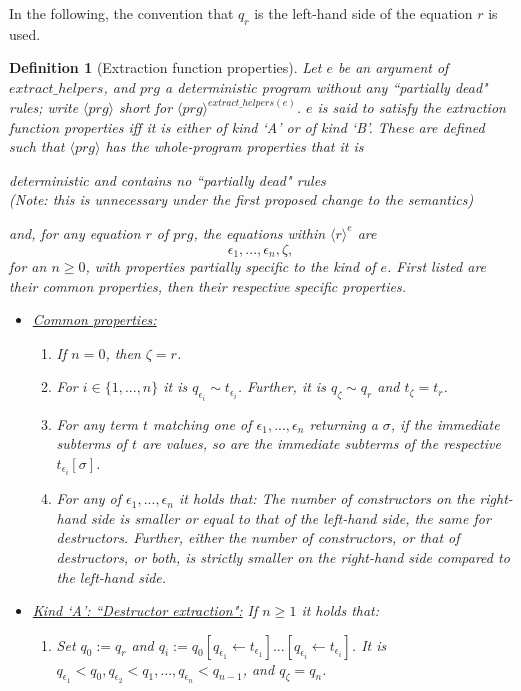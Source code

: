 \documentclass[11pt]{article} %
\newtheorem{definition}{Definition}
\begin{document}

In the following, the convention that $q_r$ is the left-hand side of the equation $r$ is used.

\begin{definition}[Extraction function properties]
Let $e$ be an argument of $extract\_helpers$, and $prg$ a deterministic program without any ``partially dead" rules; write $\langle prg \rangle$ short for $\langle prg \rangle^{extract\_helpers(e)}$. $e$ is said to satisfy the extraction function properties iff it is either of kind `A' or of kind `B'. These are defined such that $\langle prg \rangle$ has the whole-program properties that it is
\begin{center}
deterministic and contains no ``partially dead" rules\\
(Note: this is unnecessary under the first proposed change to the semantics)
\end{center}
and, for any equation $r$ of $prg$, the equations within $\langle r \rangle^e$ are
\begin{equation*}
\epsilon_1, ..., \epsilon_n, \zeta,
\end{equation*}
for an $n \geq 0$, with properties partially specific to the kind of $e$. First listed are their common properties, then their respective specific properties.

\begin{itemize}
\item \underline{Common properties:}
\begin{enumerate}
\item If $n = 0$, then $\zeta = r$.
\item For $i \in \{1, ..., n\}$ it is $q_{\epsilon_i} \sim t_{\epsilon_i}$. Further, it is $q_\zeta \sim q_r$ and $t_\zeta = t_r$.
\item For any term $t$ matching one of $\epsilon_1, ..., \epsilon_n$ returning a $\sigma$, if the immediate subterms of $t$ are values, so are the immediate subterms of the respective $t_{\epsilon_i}[\sigma]$.
\item For any of $\epsilon_1, ..., \epsilon_n$ it holds that: The number of constructors on the right-hand side is smaller or equal to that of the left-hand side, the same for destructors. Further, either the number of constructors, or that of destructors, or both, is strictly smaller on the right-hand side compared to the left-hand side.
\end{enumerate}

\item \underline{Kind `A': ``Destructor extraction":} If $n \geq 1$ it holds that:
\begin{enumerate}
\item Set $q_0 := q_r$ and $q_i := q_0[q_{\epsilon_1} \leftarrow t_{\epsilon_1}]...[q_{\epsilon_i} \leftarrow t_{\epsilon_i}]$. It is $q_{\epsilon_1} < q_0, q_{\epsilon_2} < q_1, ..., q_{\epsilon_n} < q_{n-1}$, and $q_\zeta = q_n$.
\end{enumerate}


\end{itemize}
\end{definition}
\end{document}
